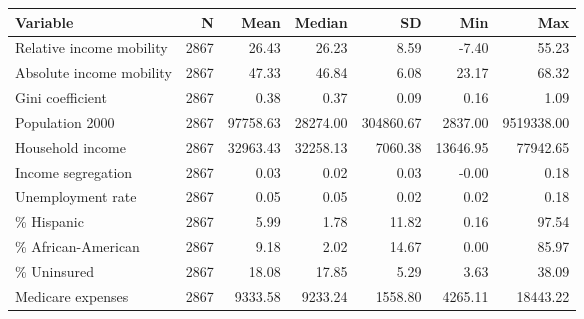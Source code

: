 \begin{table}[ht]
\centering
\begin{tabular}{lrrrrrr}
  \hline
Variable & N & Mean & Median & SD & Min & Max \\ 
  \hline
Relative income mobility & 2867 & 26.43 & 26.23 & 8.59 & -7.40 & 55.23 \\ 
  Absolute income mobility & 2867 & 47.33 & 46.84 & 6.08 & 23.17 & 68.32 \\ 
  Gini coefficient & 2867 & 0.38 & 0.37 & 0.09 & 0.16 & 1.09 \\ 
  Population 2000 & 2867 & 97758.63 & 28274.00 & 304860.67 & 2837.00 & 9519338.00 \\ 
  Household income & 2867 & 32963.43 & 32258.13 & 7060.38 & 13646.95 & 77942.65 \\ 
  Income segregation & 2867 & 0.03 & 0.02 & 0.03 & -0.00 & 0.18 \\ 
  Unemployment rate & 2867 & 0.05 & 0.05 & 0.02 & 0.02 & 0.18 \\ 
  \% Hispanic & 2867 & 5.99 & 1.78 & 11.82 & 0.16 & 97.54 \\ 
  \% African-American & 2867 & 9.18 & 2.02 & 14.67 & 0.00 & 85.97 \\ 
  \% Uninsured & 2867 & 18.08 & 17.85 & 5.29 & 3.63 & 38.09 \\ 
  Medicare expenses & 2867 & 9333.58 & 9233.24 & 1558.80 & 4265.11 & 18443.22 \\ 
   \hline
\end{tabular}
\end{table}
